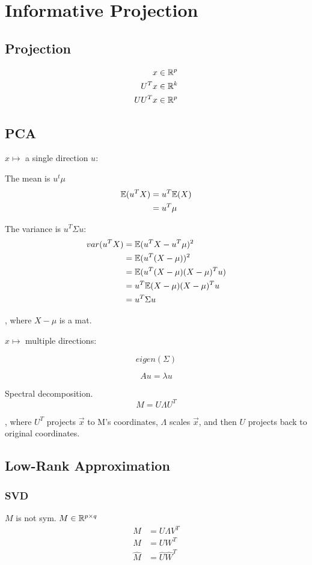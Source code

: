 \documentclass[a4paper]{report}
\begin{document}
\chapter{Informative Projection}
\section{Projection}
\begin{align*}
x &\in \mathbb{R}^p\\
U^T x &\in \mathbb{R}^k \\
UU^Tx &\in \mathbb{R}^p
\end{align*}

\section{PCA}
$x \mapsto$ a single direction $u$:

The mean is $u^t\mu$
\begin{align*}
\mathbb{E}(u^T X) &= u^T \mathbb{E}(X) \\
&= u^T \mu
\end{align*}

The variance is $u^T \Sigma u$:
\begin{align*}
var(u^T X) &= \mathbb{E}(u^T X-u^T \mu)^2\\
&= \mathbb{E}(u^T(X-\mu))^2\\
&= \mathbb{E}(u^T(X-\mu)(X-\mu)^Tu)\\
&= u^T \mathbb{E}(X-\mu)(X-\mu)^T u  \\
&= u^T \Sigma u
\end{align*}

, where $X-\mu$ is a mat. 

$x \mapsto$ multiple directions:

$$
eigen(\Sigma)
$$

$$
Au = \lambda u
$$

Spectral decomposition. 
$$
M = U\Lambda U^T
$$

, where $U^T$ projects $\vec x$ to M's coordinates, $\Lambda$ scales $\vec x$, and then  $U$ projects back to original coordinates.
\section{Low-Rank Approximation}
\subsection{SVD}
$M$ is not sym. $M\in \mathbb{R}^{p\times q}$
\begin{align*}
M &= U \Lambda V^T \\
M &=UW^T \\
\hat M &=\hat U \hat W^T
\end{align*}
\end{document}
